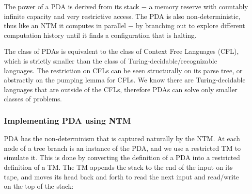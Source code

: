 \documentclass[12pt]{article}  %
\begin{document}
The power of a PDA is derived from its stack $-$ a memory reserve with countably infinite capacity and very restrictive access. The PDA is also non-deterministic, thus like an NTM it computes in parallel $-$ by branching out to explore different computation history until it finds a configuration that is halting.

The class of PDAs is equivalent to the class of Context Free Languages (CFL), which is strictly smaller than the class of Turing-decidable/recognizable languages. The restriction on CFLs can be seen structurally on its parse tree, or abstractly on the pumping lemma for CFLs. We know there are Turing-decidable languages that are outside of the CFLs, therefore PDAs can solve only smaller classes of problems. 







\subsubsection{Implementing PDA using NTM}
PDA has the non-determinism that is captured naturally by the NTM. At each node of a tree branch is an instance of the PDA, and we use a restricted TM to simulate it. This is done by converting the definition of a PDA into a restricted definition of a TM. The TM appends the stack to the end of the input on its tape, and moves its head back and forth to read the next input and read/write on the top of the stack:
\end{document}
